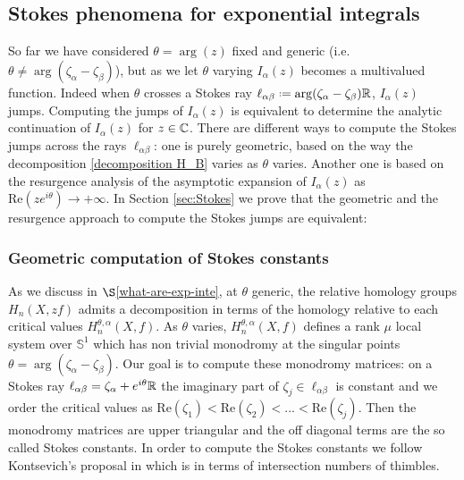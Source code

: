\documentclass[11pt,a4paper,twoside,leqno,noamsfonts]{amsart}
\numberwithin{equation}{section}
\begin{document}
\subsection{Stokes phenomena for exponential integrals}
So far we have considered $\theta=\arg(z)$ fixed and generic (i.e. $\theta\neq\arg(\zeta_\alpha-\zeta_\beta)$), but as we let $\theta$ varying $I_{\alpha}(z)$ becomes a multivalued function. Indeed when $\theta$ crosses a Stokes ray $\ell_{\alpha\beta}\defeq\arg(\zeta_\alpha-\zeta_\beta)\R$, $I_\alpha(z)$ jumps. Computing the jumps of $I_{\alpha}(z)$ is equivalent to determine the analytic continuation of $I_\alpha(z)$ for $z\in\mathbb C$. There are different ways to compute the Stokes jumps across the rays $\ell_{\alpha\beta}$: one is purely geometric, based on the way the decomposition \eqref{decomposition H_B} varies as $\theta$ varies. Another one is based on the resurgence analysis of the asymptotic expansion of $I_{\alpha}(z)$ as $\mathrm{Re}(z e^{i\theta})\to +\infty$. In Section \ref{sec:Stokes} we prove that the geometric and the resurgence approach to compute the Stokes jumps are equivalent:
\begin{theorem}

\end{theorem}  

    
\subsubsection{Geometric computation of Stokes constants}
As we discuss in $\S$\ref{what-are-exp-inte}, at $\theta$ generic, the relative homology groups $H_n(X,zf)$ admits a decomposition in terms of the homology relative to each critical values $H_n^{\theta,\alpha}(X,f)$. As $\theta$ varies, $H_n^{\theta,\alpha}(X,f)$ defines a rank $\mu$ local system over $\mathbb{S}^1$ which has non trivial monodromy at the singular points $\theta=\arg(\zeta_\alpha-\zeta_\beta)$. Our goal is to compute these monodromy matrices: on a Stokes ray $\ell_{\alpha\beta}=\zeta_\alpha+e^{i\theta}\mathbb R$ the imaginary part of $\zeta_j\in\ell_{\alpha\beta}$ is constant and we order the critical values as $\mathrm{Re}(\zeta_1)<\mathrm{Re}(\zeta_2)<...<\mathrm{Re}(\zeta_j)$. Then the monodromy matrices are upper triangular and the off diagonal terms are the so called Stokes constants. 
In order to compute the Stokes constants we follow Kontsevich's proposal in \cite{Maxim_lectures} which is in terms of intersection numbers of thimbles. 
\end{document}

